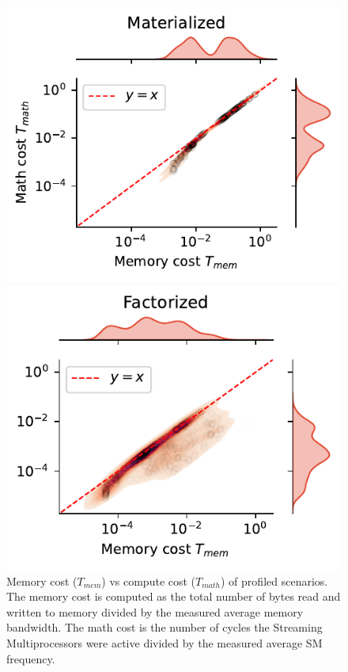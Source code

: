 \begin{figure}[ht]
  \centering
  \begin{minipage}{0.50\textwidth}
    \includegraphics[width=\linewidth]{chapters/05_cost_estimation/figures/profiling-mem-vs-compute-materialized.pdf}
  \end{minipage}\hfill
  \begin{minipage}{0.50\textwidth}
    \includegraphics[width=\linewidth]{chapters/05_cost_estimation/figures/profiling-mem-vs-compute-factorized.pdf}
  \end{minipage}
  \caption[Memory cost vs math cost of profiled scenarios]{Memory cost ($T_{mem}$) vs compute cost ($T_{math}$) of profiled scenarios. The memory cost is computed as the total number of bytes read and written to memory divided by the measured average memory bandwidth. The math cost is the number of cycles the Streaming Multiprocessors were active divided by the measured average SM frequency.}
  \label{fig:5-profiling-mem-vs-compute}
\end{figure}

